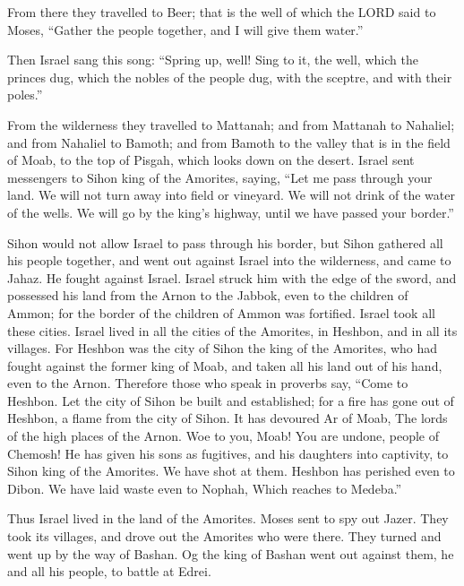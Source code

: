  From there they travelled to Beer; that is the well of
which the LORD said to Moses, ``Gather the people together, and I will
give them water.''

 Then Israel sang this song: ``Spring up, well! Sing to it,
 the well, which the princes dug, which the nobles of the
people dug, with the sceptre, and with their poles.''

From the wilderness they travelled to Mattanah;  and from
Mattanah to Nahaliel; and from Nahaliel to Bamoth;  and
from Bamoth to the valley that is in the field of Moab, to the top of
Pisgah, which looks down on the desert.  Israel sent
messengers to Sihon king of the Amorites, saying,  ``Let me
pass through your land. We will not turn away into field or vineyard. We
will not drink of the water of the wells. We will go by the king's
highway, until we have passed your border.''

 Sihon would not allow Israel to pass through his border,
but Sihon gathered all his people together, and went out against Israel
into the wilderness, and came to Jahaz. He fought against Israel.
 Israel struck him with the edge of the sword, and
possessed his land from the Arnon to the Jabbok, even to the children of
Ammon; for the border of the children of Ammon was fortified.
 Israel took all these cities. Israel lived in all the
cities of the Amorites, in Heshbon, and in all its villages.
 For Heshbon was the city of Sihon the king of the
Amorites, who had fought against the former king of Moab, and taken all
his land out of his hand, even to the Arnon.  Therefore
those who speak in proverbs say, ``Come to Heshbon. Let the city of
Sihon be built and established;  for a fire has gone out of
Heshbon, a flame from the city of Sihon. It has devoured Ar of Moab, The
lords of the high places of the Arnon.  Woe to you, Moab!
You are undone, people of Chemosh! He has given his sons as fugitives,
and his daughters into captivity, to Sihon king of the Amorites.
 We have shot at them. Heshbon has perished even to Dibon.
We have laid waste even to Nophah, Which reaches to Medeba.''

 Thus Israel lived in the land of the Amorites.
 Moses sent to spy out Jazer. They took its villages, and
drove out the Amorites who were there.  They turned and
went up by the way of Bashan. Og the king of Bashan went out against
them, he and all his people, to battle at Edrei.


